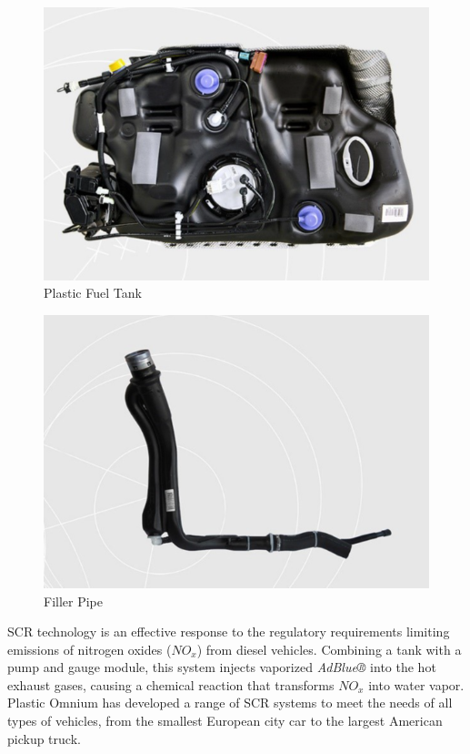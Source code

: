 \begin{figure}
\centerline{\includegraphics[scale=0.6]{images/appendix_A/Plastic_fuel_tank.png}}
\caption{Plastic Fuel Tank}
\label{fig:Plastic Fuel Tank}
\end{figure}
\begin{figure}
\centerline{\includegraphics[scale=0.6]{images/appendix_A/Filler_pipe.png}}
\caption{Filler Pipe}
\label{fig:Filler Pipe}
\end{figure}

SCR technology is an effective response to the regulatory requirements limiting emissions of nitrogen oxides ($NO_x$) from diesel vehicles. Combining a tank with a pump and gauge module, this system injects vaporized \textit{AdBlue®} into the hot exhaust gases, causing a chemical reaction that transforms $NO_x$ into water vapor. Plastic Omnium has developed a range of SCR systems to meet the needs of all types of vehicles, from the smallest European city car to the largest American pickup truck.


